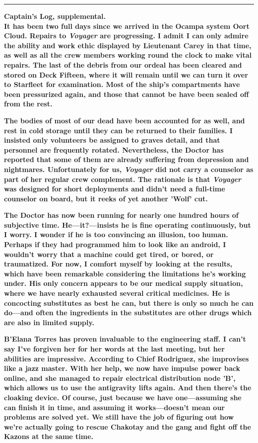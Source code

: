 \documentclass[twoside,letterpaper,12pt]{memoir}
\begin{document}
\begin{center}\rule{3cm}{0.4 pt}\end{center} 

\noindent\textbf{Captain's Log, supplemental.} \\

\textbf{It has been two full days since we arrived in the Ocampa system Oort Cloud. Repairs to \textit{Voyager} are progressing. I admit I can only admire the ability and work ethic displayed by Lieutenant Carey in that time, as well as all the crew members working round the clock to make vital repairs. The last of the debris from our ordeal has been cleared and stored on Deck Fifteen, where it will remain until we can turn it over to Starfleet for examination. Most of the ship's compartments have been pressurized again, and those that cannot be have been sealed off from the rest. }

\textbf{The bodies of most of our dead have been accounted for as well, and rest in cold storage until they can be returned to their families. I insisted only volunteers be assigned to graves detail, and that personnel are frequently rotated. Nevertheless, the Doctor has reported that some of them are already suffering from depression and nightmares. Unfortunately for us, \textit{Voyager} did not carry a counselor as part of her regular crew complement. The rationale is that \textit{Voyager} was designed for short deployments and didn't need a full-time counselor on board, but it reeks of yet another 'Wolf' cut.} 

\textbf{The Doctor has now been running for nearly one hundred hours of subjective time. He---it?---insists he is fine operating continuously, but I worry. I wonder if he is too convincing an illusion, too human. Perhaps if they had programmed him to look like an android, I wouldn't worry that a machine could get tired, or bored, or traumatized. For now, I comfort myself by looking at the results, which have been remarkable considering the limitations he's working under. His only concern appears to be our medical supply situation, where we have nearly exhausted several critical medicines. He is concocting substitutes as best he can, but there is only so much he can do---and often the ingredients in the substitutes are other drugs which are also in limited supply.} 

\textbf{B'Elana Torres has proven invaluable to the engineering staff. I can't say I've forgiven her for her words at the last meeting, but her abilities are impressive. According to Chief Rodriguez, she improvises like a jazz master. With her help, we now have impulse power back online, and she managed to repair electrical distribution node 'B', which allows us to use the antigravity lifts again. And then there's the cloaking device. Of course, just because we have one---assuming she can finish it in time, and assuming it works---doesn't mean our problems are solved yet. We still have the job of figuring out how we're actually going to rescue Chakotay and the gang and fight off the Kazons at the same time. }
\end{document}
